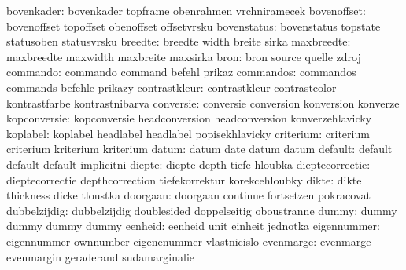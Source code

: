           bovenkader:  bovenkader           topframe             obenrahmen
                       vrchniramecek
         bovenoffset:  bovenoffset          topoffset            obenoffset
                       offsetvrsku
         bovenstatus:  bovenstatus          topstate             statusoben
                       statusvrsku
             breedte:  breedte              width                breite
                       sirka
          maxbreedte:  maxbreedte           maxwidth             maxbreite
                       maxsirka
                bron:  bron                 source               quelle
                       zdroj
            commando:  commando             command              befehl
                       prikaz
           commandos:  commandos            commands             befehle
                       prikazy
       contrastkleur:  contrastkleur        contrastcolor        kontrastfarbe
                       kontrastnibarva
           conversie:  conversie            conversion           konversion
                       konverze
        kopconversie:  kopconversie         headconversion       headconversion
                       konverzehlavicky %
            koplabel:  koplabel             headlabel            headlabel
                       popisekhlavicky %
           criterium:  criterium            criterium            kriterium
                       kriterium
               datum:  datum                date                 datum
                       datum
             default:  default              default              default
                       implicitni
              diepte:  diepte               depth                tiefe
                       hloubka
     dieptecorrectie:  dieptecorrectie      depthcorrection      tiefekorrektur
                       korekcehloubky
               dikte:  dikte                thickness            dicke
                       tloustka
            doorgaan:  doorgaan             continue             fortsetzen
                       pokracovat
        dubbelzijdig:  dubbelzijdig         doublesided          doppelseitig
                       oboustranne
               dummy:  dummy                dummy                dummy
                       dummy
             eenheid:  eenheid              unit                 einheit
                       jednotka
         eigennummer:  eigennummer          ownnumber            eigenenummer
                       vlastnicislo
           evenmarge:  evenmarge            evenmargin           geraderand
                       sudamarginalie
